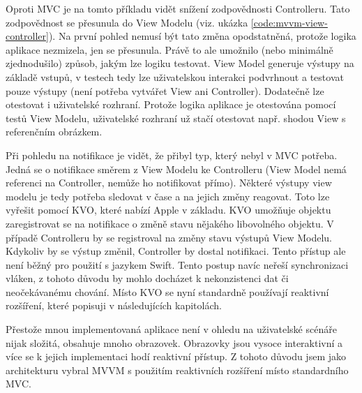 Oproti MVC je na tomto příkladu vidět snížení zodpovědnosti Controlleru.
Tato zodpovědnost se přesunula do View Modelu (viz. ukázka \ref{code:mvvm-view-controller}).
Na první pohled nemusí být tato změna opodstatněná, protože logika aplikace nezmizela, jen se přesunula.
Právě to ale umožnilo (nebo minimálně zjednodušilo) způsob, jakým lze logiku testovat.
View Model generuje výstupy na základě vstupů, v testech tedy lze uživatelskou interakci podvrhnout a testovat pouze výstupy (není potřeba vytvářet View ani Controller).
Dodatečně lze otestovat i uživatelské rozhraní.
Protože logika aplikace je otestována pomocí testů View Modelu, uživatelské rozhraní už stačí otestovat např. shodou View s referenčním obrázkem.


Při pohledu na notifikace je vidět, že přibyl typ, který nebyl v MVC potřeba.
Jedná se o notifikace směrem z View Modelu ke Controlleru (View Model nemá referenci na Controller, nemůže ho notifikovat přímo).
Některé výstupy view modelu je tedy potřeba sledovat v čase a na jejich změny reagovat.
Toto lze vyřešit pomocí KVO, které nabízí Apple v základu.
KVO umožňuje objektu zaregistrovat se na notifikace o změně stavu nějakého libovolného objektu.
V případě Controlleru by se registroval na změny stavu výstupů View Modelu.
Kdykoliv by se výstup změnil, Controller by dostal notifikaci.
Tento přístup ale není běžný pro použití s jazykem Swift.
Tento postup navíc neřeší synchronizaci vláken, z tohoto důvodu by mohlo docházet k nekonzistenci dat či neočekávanému chování.
Místo KVO se nyní standardně používají reaktivní rozšíření, které popisuji v následujících kapitolách.

Přestože mnou implementovaná aplikace není v ohledu na uživatelské scénáře nijak složitá, obsahuje mnoho obrazovek.
Obrazovky jsou vysoce interaktivní a více se k jejich implementaci hodí reaktivní přístup.
Z tohoto důvodu jsem jako architekturu vybral MVVM s použitím reaktivních rozšíření místo standardního MVC.

